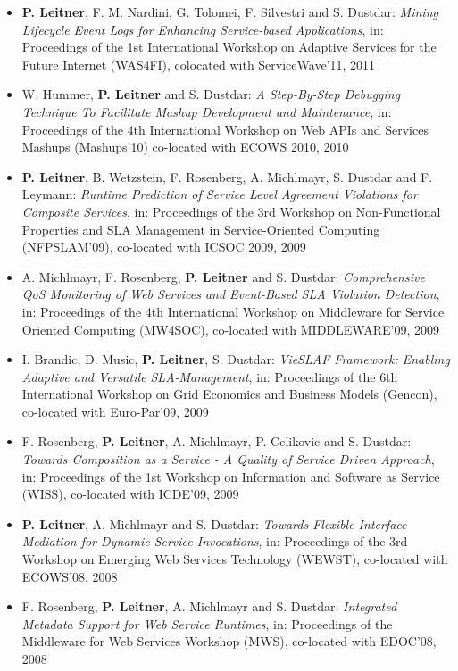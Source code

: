 \documentclass[paper=letter,fontsize=11pt]{scrartcl} %
\begin{document}
\begin{itemize}
\item \textbf{P. Leitner}, F. M. Nardini, G. Tolomei, F. Silvestri
and S. Dustdar: \emph{Mining Lifecycle Event Logs for Enhancing
Service-based Applications}, in: Proceedings of the 1st International Workshop on Adaptive Services
for the Future Internet (WAS4FI), colocated with ServiceWave'11, 2011
\item W. Hummer, \textbf{P. Leitner} and S. Dustdar: \emph{A Step-By-Step Debugging Technique To Facilitate Mashup Development and Maintenance}, in: Proceedings of the 4th International Workshop on Web APIs and Services Mashups (Mashups'10) co-located with ECOWS 2010, 2010
\item \textbf{P. Leitner}, B. Wetzstein, F. Rosenberg, A. Michlmayr, S. Dustdar and F. Leymann: \emph{Runtime Prediction of Service Level Agreement Violations for Composite Services}, in: Proceedings of the 3rd Workshop on Non-Functional Properties and SLA Management in Service-Oriented Computing (NFPSLAM'09), co-located with ICSOC 2009, 2009
\item A. Michlmayr, F. Rosenberg, \textbf{P. Leitner} and S. Dustdar: \emph{Comprehensive QoS Monitoring of Web Services and Event-Based SLA Violation Detection}, in: Proceedings of the 4th International Workshop on Middleware for Service Oriented Computing (MW4SOC), co-located with MIDDLEWARE'09, 2009
\item I. Brandic, D. Music, \textbf{P. Leitner}, S. Dustdar: \emph{VieSLAF Framework: Enabling Adaptive and Versatile SLA-Management}, in: Proceedings of the 6th International Workshop on Grid Economics and Business Models (Gencon), co-located with Euro-Par'09, 2009
\item F. Rosenberg, \textbf{P. Leitner}, A. Michlmayr, P. Celikovic and S. Dustdar: \emph{Towards Composition as a Service - A Quality of Service Driven Approach}, in: Proceedings of the 1st Workshop on Information and Software as Service (WISS), co-located with ICDE'09, 2009
\item \textbf{P. Leitner}, A. Michlmayr and S. Dustdar: \emph{Towards Flexible Interface Mediation for Dynamic Service Invocations}, in: Proceedings of the 3rd Workshop on Emerging Web Services Technology (WEWST), co-located with ECOWS'08, 2008
\item F. Rosenberg, \textbf{P. Leitner}, A. Michlmayr and S. Dustdar: \emph{Integrated Metadata Support for Web Service Runtimes}, in: Proceedings of the Middleware for Web Services Workshop (MWS), co-located with EDOC'08, 2008
\end{itemize}
\end{document}
